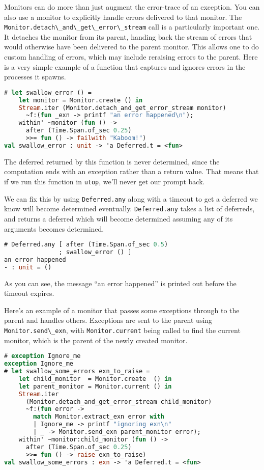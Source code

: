 Monitors can do more than just augment the error-trace of an exception.
You can also use a monitor to explicitly handle errors delivered to that
monitor. The
\passthrough{\lstinline!Monitor.detach\_and\_get\_error\_stream!} call
is a particularly important one. It detaches the monitor from its
parent, handing back the stream of errors that would otherwise have been
delivered to the parent monitor. This allows one to do custom handling
of errors, which may include reraising errors to the parent. Here is a
very simple example of a function that captures and ignores errors in
the processes it spawns.

\begin{lstlisting}[language=Caml]
# let swallow_error () =
    let monitor = Monitor.create () in
    Stream.iter (Monitor.detach_and_get_error_stream monitor)
      ~f:(fun _exn -> printf "an error happened\n");
    within' ~monitor (fun () ->
      after (Time.Span.of_sec 0.25)
      >>= fun () -> failwith "Kaboom!")
val swallow_error : unit -> 'a Deferred.t = <fun>
\end{lstlisting}

The deferred returned by this function is never determined, since the
computation ends with an exception rather than a return value. That
means that if we run this function in \passthrough{\lstinline!utop!},
we'll never get our prompt back.

We can fix this by using \passthrough{\lstinline!Deferred.any!} along
with a timeout to get a deferred we know will become determined
eventually. \passthrough{\lstinline!Deferred.any!} takes a list of
deferreds, and returns a deferred which will become determined assuming
any of its arguments becomes determined.

\begin{lstlisting}[language=Caml]
# Deferred.any [ after (Time.Span.of_sec 0.5)
               ; swallow_error () ]
an error happened
- : unit = ()
\end{lstlisting}

As you can see, the message ``an error happened'' is printed out before
the timeout expires.

Here's an example of a monitor that passes some exceptions through to
the parent and handles others. Exceptions are sent to the parent using
\passthrough{\lstinline!Monitor.send\_exn!}, with
\passthrough{\lstinline!Monitor.current!} being called to find the
current monitor, which is the parent of the newly created monitor.

\begin{lstlisting}[language=Caml]
# exception Ignore_me
exception Ignore_me
# let swallow_some_errors exn_to_raise =
    let child_monitor  = Monitor.create  () in
    let parent_monitor = Monitor.current () in
    Stream.iter
      (Monitor.detach_and_get_error_stream child_monitor)
      ~f:(fun error ->
        match Monitor.extract_exn error with
        | Ignore_me -> printf "ignoring exn\n"
        | _ -> Monitor.send_exn parent_monitor error);
    within' ~monitor:child_monitor (fun () ->
      after (Time.Span.of_sec 0.25)
      >>= fun () -> raise exn_to_raise)
val swallow_some_errors : exn -> 'a Deferred.t = <fun>
\end{lstlisting}

